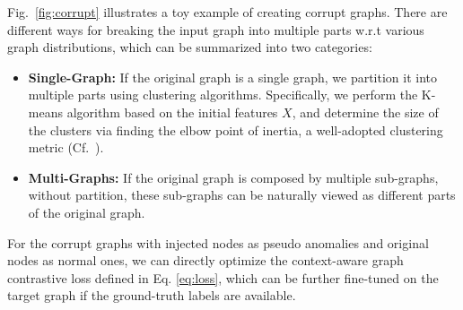 


Fig.~\ref{fig:corrupt} illustrates a toy example of creating corrupt graphs. 
There are different ways for breaking the input graph into multiple parts w.r.t various graph distributions, which can be summarized into two categories:

	
\begin{itemize}[leftmargin=*]
	\item \textbf{Single-Graph:} If the original graph is a single graph, we partition it into multiple parts using clustering algorithms. 
	Specifically, we perform the K-means algorithm based on the initial features $X$, and determine the size of the clusters via finding the elbow point of inertia, a well-adopted clustering metric (Cf.~). 
	\item \textbf{Multi-Graphs:} If the original graph is composed by multiple sub-graphs, without partition, these sub-graphs can be naturally viewed as different parts of the original graph.
	 
\end{itemize}


For the corrupt graphs with injected nodes as pseudo anomalies and original nodes as normal ones, we can directly optimize the context-aware graph contrastive loss defined in Eq. \eqref{eq:loss}, which can be further fine-tuned on the target graph if the ground-truth labels are available. 



